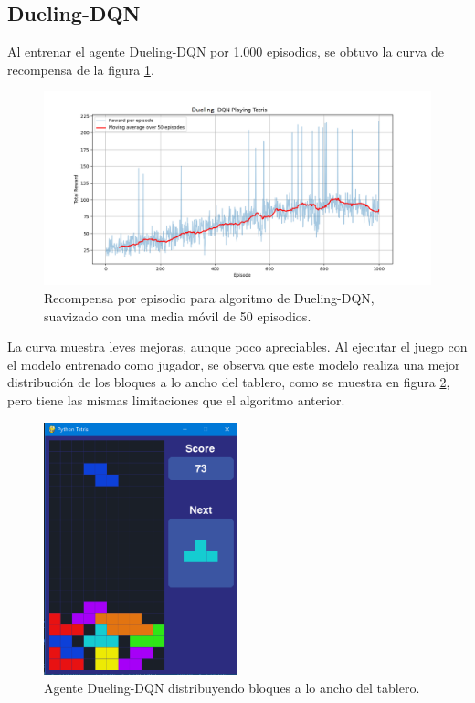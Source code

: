 \subsection{Dueling-DQN}

Al entrenar el agente Dueling-DQN por 1.000 episodios, se obtuvo la curva de recompensa de la figura \ref{fig:dueling_dqn_rewards}.

\begin{figure}[htbp]
	\centering
	\includegraphics[width=\textwidth]{./Figures/dueling_dqn_rewards.png}
	\caption{Recompensa por episodio para algoritmo de Dueling-DQN, suavizado con una media móvil de 50 episodios.}
	\label{fig:dueling_dqn_rewards}
\end{figure}

La curva muestra leves mejoras, aunque poco apreciables. Al ejecutar el juego con el modelo entrenado como jugador, se observa que este modelo realiza una mejor distribución de los bloques a lo ancho del tablero, como se muestra en figura \ref{fig:dueling_dqn_playing}, pero tiene las mismas limitaciones que el algoritmo anterior.

\clearpage

\begin{figure}[htbp]
	\centering
	\includegraphics[width=0.5\textwidth]{./Figures/dueling_dqn_playing.png}
	\caption{Agente Dueling-DQN distribuyendo bloques a lo ancho del tablero.}
	\label{fig:dueling_dqn_playing}
\end{figure}

